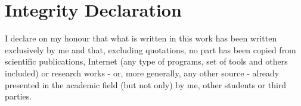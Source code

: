 \chapter*{Integrity Declaration}
I declare on my honour that what is written in this work has been written exclusively by me and that, excluding quotations, no part has been copied from scientific publications, Internet (any type of programs, set of tools and others included) or research works - or, more generally, any other source - already presented in the academic field (but not only) by me, other students or third parties.